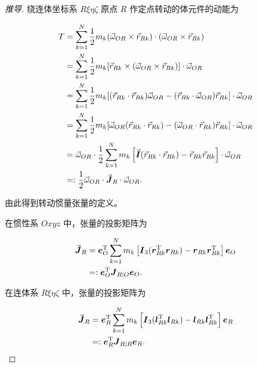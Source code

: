 \begin{proof}[推导]
绕连体坐标系 $R\xi\eta\zeta$ 原点 $R$ 作定点转动的体元件的动能为

\begin{align*}T &= \sum_{k=1}^{N} \frac{1}{2} m_k (\vec{\omega}_{OR} \times \vec{r}_{Rk}) \cdot (\vec{\omega}_{OR} \times \vec{r}_{Rk}) \notag \\
&= \sum_{k=1}^{N} \frac{1}{2} m_k [\vec{r}_{Rk} \times (\vec{\omega}_{OR} \times \vec{r}_{Rk})] \cdot \vec{\omega}_{OR} \notag \\
&= \sum_{k=1}^{N} \frac{1}{2} m_k [(\vec{r}_{Rk} \cdot \vec{r}_{Rk}) \vec{\omega}_{OR} - (\vec{r}_{Rk} \cdot \vec{\omega}_{OR}) \vec{r}_{Rk}] \cdot \vec{\omega}_{OR} \notag \\
&= \sum_{k=1}^{N} \frac{1}{2} m_k [\vec{\omega}_{OR} (\vec{r}_{Rk} \cdot \vec{r}_{Rk}) - (\vec{\omega}_{OR} \cdot \vec{r}_{Rk}) \vec{r}_{Rk}] \cdot \vec{\omega}_{OR} \notag \\
&= \vec{\omega}_{OR} \cdot \frac{1}{2} \sum_{k=1}^{N} m_k \left[ \vec{\boldsymbol{I}} (\vec{r}_{Rk} \cdot \vec{r}_{Rk}) - \vec{r}_{Rk} \vec{r}_{Rk} \right] \cdot \vec{\omega}_{OR} \notag \\
&=: \frac{1}{2} \vec{\omega}_{OR} \cdot \vec{\boldsymbol{J}}_R \cdot \vec{\omega}_{OR}.\end{align*}

由此得到转动惯量张量的定义。

在惯性系 $Oxyz$ 中，张量的投影矩阵为

\begin{align*}\vec{\boldsymbol{J}}_R &= \boldsymbol{e}_O^{\mathrm{T}} \sum_{k=1}^{N} m_k \left[ \boldsymbol{I}_3 (\boldsymbol{r}_{Rk}^{\mathrm{T}} \boldsymbol{r}_{Rk}) - \boldsymbol{r}_{Rk} \boldsymbol{r}_{Rk}^{\mathrm{T}} \right] \boldsymbol{e}_O \notag \\
&=: \boldsymbol{e}_O^{\mathrm{T}} \boldsymbol{J}_{R|O} \boldsymbol{e}_O.\end{align*}

在连体系 $R\xi\eta\zeta$ 中，张量的投影矩阵为

\begin{align*}\vec{\boldsymbol{J}}_R &= \boldsymbol{e}_R^{\mathrm{T}} \sum_{k=1}^{N} m_k \left[ \boldsymbol{I}_3 (\boldsymbol{l}_{Rk}^{\mathrm{T}} \boldsymbol{l}_{Rk}) - \boldsymbol{l}_{Rk} \boldsymbol{l}_{Rk}^{\mathrm{T}} \right] \boldsymbol{e}_R \notag \\
&=: \boldsymbol{e}_R^{\mathrm{T}} \boldsymbol{J}_{R|R} \boldsymbol{e}_R.\end{align*}


\end{proof}
